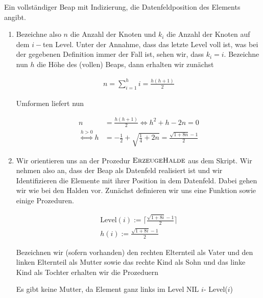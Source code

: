 \begin{solution}



Ein vollständiger Beap mit Indizierung, die Datenfeldposition des Elements angibt.
\begin{enumerate}[label = \alph*)]
  \item Bezeichne also $n$ die Anzahl der Knoten und $k_i$ die Anzahl der Knoten auf dem $i-$ten Level. Unter der Annahme, dass das letzte Level voll ist, was bei der gegebenen Definition immer der Fall ist, sehen wir, dass $k_i = i$. Bezeichne nun $h$ die Höhe des (vollen) Beaps, dann erhalten wir zunächst

  \begin{align*}
    n
    =
    \sum_{i=1}^h i
    =
    \frac{h(h+1)}{2}
  \end{align*}

  Umformen liefert nun

  \begin{align*}
    n
    &=
    \frac{h(h+1)}{2}
    \iff
    h^2 + h - 2n = 0 \\
    \stackrel{h > 0}{\iff}
    h &= -\frac{1}{2} + \sqrt{\frac{1}{4} + 2n}
    = \frac{\sqrt{1 + 8n} - 1}{2}
  \end{align*}

  \item Wir orientieren uns an der Prozedur $\textsc{ErzeugeHalde}$ aus dem Skript. Wir nehmen also an, dass der Beap als Datenfeld realisiert ist und wir Identifizieren die Elemente mit ihrer Position in dem Datenfeld. Dabei gehen wir wie bei den Halden vor. Zunächst definieren wir uns eine Funktion sowie einige Prozeduren.

  \begin{align*}
    \mathrm{Level}(i) := \Big\lceil \frac{\sqrt{1 + 8i} - 1}{2}\Big\rceil \\
    h(i) := \frac{\sqrt{1 + 8i} - 1}{2}
  \end{align*}

  Bezeichnen wir (sofern vorhanden) den rechten Elternteil als Vater und den linken Elternteil als Mutter sowie das rechte Kind als Sohn und das linke Kind als Tochter erhalten wir die Prozeduern



    \begin{algorithmic}[1]
            \Comment Es gibt keine Mutter, da Element ganz links im Level
                \State \Return NIL
            \Else
                \State \Return $i$- Level($i$)
            \EndIf
        \EndProcedure
    \end{algorithmic}


\end{enumerate}
\end{solution}
